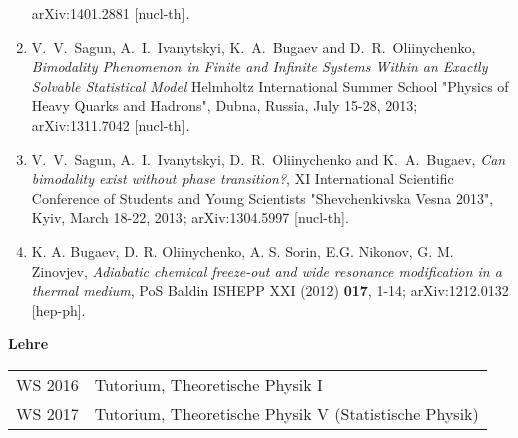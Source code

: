 \begin{lebenslauf}
\begin{enumerate}
          arXiv:1401.2881 [nucl-th].
    \item V.~V.~Sagun, A.~I.~Ivanytskyi, K.~A.~Bugaev and D.~R.~Oliinychenko,
          \emph{Bimodality Phenomenon in Finite and Infinite Systems Within an Exactly Solvable
          Statistical Model}
          Helmholtz International Summer School "Physics of Heavy Quarks and Hadrons", Dubna,
          Russia, July 15-28, 2013;
          arXiv:1311.7042 [nucl-th].
    \item V.~V.~Sagun, A.~I.~Ivanytskyi, D.~R.~Oliinychenko and K.~A.~Bugaev,
	      \emph{Can bimodality exist without phase transition?},
	      XI International Scientific Conference of Students and Young
	      Scientists "Shevchenkivska Vesna 2013", Kyiv, March 18-22, 2013;
	      arXiv:1304.5997 [nucl-th].
    \item K. A. Bugaev, D. R. Oliinychenko, A. S. Sorin, E.G. Nikonov, G. M. Zinovjev,
          \emph{Adiabatic chemical freeze-out and wide resonance modification in a thermal
          medium},
          {PoS Baldin ISHEPP XXI} (2012) \textbf{ 017}, 1-14; arXiv:1212.0132 [hep-ph].
\end{enumerate}

\vspace{0.5 cm}

{\Large \textbf{Lehre}} \\

\vspace{0.5 cm}

\begin{tabular}{m{3cm}m{13cm}}
WS 2016  & Tutorium, Theoretische Physik I \\
WS 2017  & Tutorium, Theoretische Physik V (Statistische Physik) \\
\end{tabular}

\end{lebenslauf}



